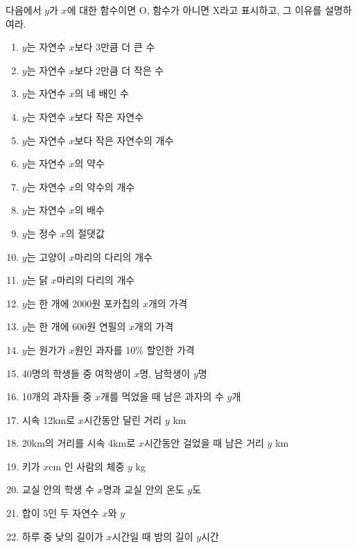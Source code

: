 \documentclass{article}
\begin{document}
다음에서 $y$가 $x$에 대한 함수이면 O, 함수가 아니면 X라고 표시하고, 그 이유를 설명하여라.
\begin{multicols}{2}

\begin{enumerate}[label=(\arabic*), itemsep=30pt]
    \item
    $y$는 자연수 $x$보다 3만큼 더 큰 수
    \item
    $y$는 자연수 $x$보다 2만큼 더 작은 수
    \item
    $y$는 자연수 $x$의 네 배인 수
    \item
    $y$는 자연수 $x$보다 작은 자연수
    \item
    $y$는 자연수 $x$보다 작은 자연수의 개수
    \item
    $y$는 자연수 $x$의 약수
    \item
    $y$는 자연수 $x$의 약수의 개수
    \item
    $y$는 자연수 $x$의 배수
    \item
    $y$는 정수 $x$의 절댓값
    \item
    $y$는 고양이 $x$마리의 다리의 개수
    \item
    $y$는 닭 $x$마리의 다리의 개수
    \item
    $y$는 한 개에 2000원 포카칩의 $x$개의 가격
    \item
    $y$는 한 개에 600원 연필의 $x$개의 가격
    \item
    $y$는 원가가 $x$원인 과자를 10\% 할인한 가격
    \item
    40명의 학생들 중 여학생이 $x$명, 남학생이 $y$명
    \item
    10개의 과자들 중 $x$개를 먹었을 때 남은 과자의 수 $y$개
    \item
    시속 12km로 $x$시간동안 달린 거리 $y$ km
    \item
    20km의 거리를 시속 4km로 $x$시간동안 걸었을 때 남은 거리 $y$ km
    \item
    키가 $x$cm 인 사람의 체중 $y$ kg
    \item
    교실 안의 학생 수 $x$명과 교실 안의 온도 $y$도
    \item
    합이 5인 두 자연수 $x$와 $y$
    \item
    하루 중 낮의 길이가 $x$시간일 때 밤의 길이 $y$시간
\end{enumerate}
\end{multicols}
\end{document}
